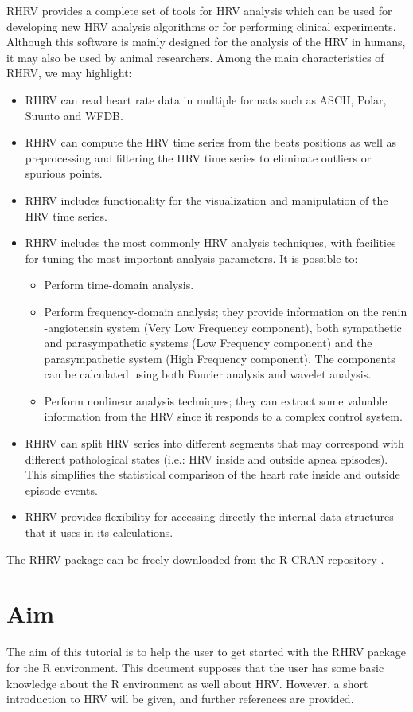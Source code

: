 \documentclass[12pt,lot, lof]{puthesis}
\begin{document}
RHRV provides a complete set of
tools for \gls{HRV} analysis which can be used for developing new \gls{HRV} 
analysis algorithms or for performing clinical experiments. Although this 
software is 
mainly designed for the analysis of the \gls{HRV} in humans, it may also be 
used by animal researchers. Among the main characteristics of RHRV, we may 
highlight:
\begin{itemize}
\item RHRV can read heart rate data in multiple formats such as ASCII, Polar, 
Suunto and WFDB.
\item RHRV can compute the \gls{HRV} time series from the beats positions as 
well as preprocessing  and filtering the \gls{HRV} time series to eliminate 
outliers or spurious points.
\item RHRV includes functionality for the visualization and manipulation of the 
\gls{HRV} time series.
\item RHRV includes the most commonly \gls{HRV} analysis techniques, with 
facilities for tuning the most important analysis parameters. It is possible to:
	 \begin{itemize}
	 	\item Perform time-domain analysis.
		\item Perform frequency-domain analysis; they provide 
information on the renin	-angiotensin system (Very Low Frequency 
component), both sympathetic and
		parasympathetic systems (Low Frequency component) and the 
parasympathetic system (High Frequency component). The components can be 
calculated using both Fourier analysis
		and wavelet analysis.
		\item Perform nonlinear analysis techniques; they can extract 
some valuable information from the \gls{HRV} since it responds to a complex 
control
		system.
	 \end{itemize}
\item RHRV can	 split \gls{HRV} series into different segments that may 
correspond with different pathological states (i.e.: \gls{HRV} inside and 
outside apnea episodes). This simplifies
the statistical comparison of the heart rate inside and outside episode events.
\item RHRV provides flexibility for accessing directly the internal data 
structures that it uses in its calculations.
\end{itemize}

The RHRV package can be freely downloaded from the R-CRAN repository 
\cite{cran}. \\
\section{Aim} The aim of this tutorial is to help the user to get started with 
the RHRV package for the R environment. This document supposes that the user 
has some basic knowledge about the R environment as well about \gls{HRV}. 
However, a short introduction to \gls{HRV} will be given, and further 
references are provided.
\end{document}
